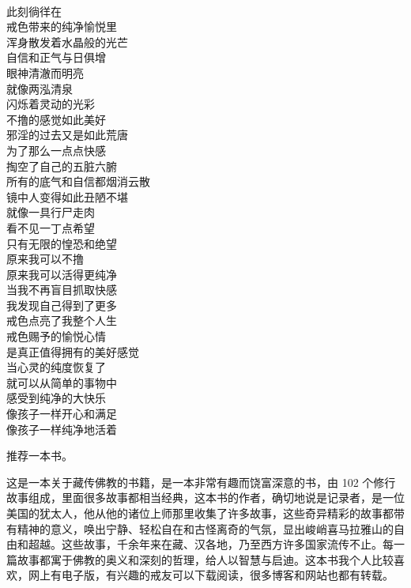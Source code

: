 \begin{poem}[童真住]
    \begin{multicols}{3}
        \centering~\\
        此刻徜徉在 \\ 戒色带来的纯净愉悦里 \\ 浑身散发着水晶般的光芒 \\ 自信和正气与日俱增 \\ 眼神清澈而明亮 \\ 就像两泓清泉 \\ 闪烁着灵动的光彩 \\ 不撸的感觉如此美好 \\ 邪淫的过去又是如此荒唐 \\ 为了那么一点点快感 \\ 掏空了自己的五脏六腑 \\ 所有的底气和自信都烟消云散 \\ 镜中人变得如此丑陋不堪 \\ 就像一具行尸走肉 \\ 看不见一丁点希望 \\ 只有无限的惶恐和绝望 \\ 原来我可以不撸 \\ 原来我可以活得更纯净 \\ 当我不再盲目抓取快感 \\ 我发现自己得到了更多 \\ 戒色点亮了我整个人生 \\ 戒色赐予的愉悦心情 \\ 是真正值得拥有的美好感觉 \\ 当心灵的纯度恢复了 \\ 就可以从简单的事物中 \\ 感受到纯净的大快乐 \\ 像孩子一样开心和满足 \\ 像孩子一样纯净地活着
    \end{multicols}
\end{poem}

推荐一本书。

\begin{book}[《雪狮的蓝绿色鬃毛》]
    这是一本关于藏传佛教的书籍，是一本非常有趣而饶富深意的书，由 102 个修行故事组成，里面很多故事都相当经典，这本书的作者，确切地说是记录者，是一位美国的犹太人，他从他的诸位上师那里收集了许多故事，这些奇异精彩的故事都带有精神的意义，唤出宁静、轻松自在和古怪离奇的气氛，显出峻峭喜马拉雅山的自由和超越。这些故事，千余年来在藏、汉各地，乃至西方许多国家流传不止。每一篇故事都寓于佛教的奥义和深刻的哲理，给人以智慧与启迪。这本书我个人比较喜欢，网上有电子版，有兴趣的戒友可以下载阅读，很多博客和网站也都有转载。
\end{book}
